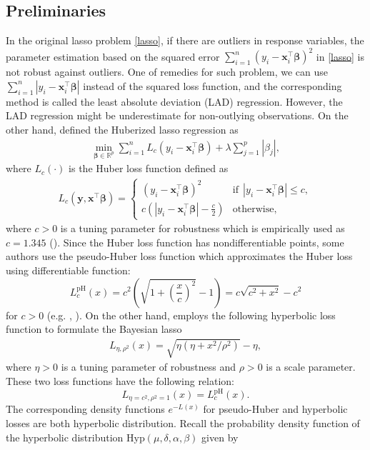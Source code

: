 \documentclass[11pt]{article}
\theoremstyle{plain}
\theoremstyle{definition}
\begin{document}
\subsection{Preliminaries} 
In the original lasso problem \eqref{lasso}, if there are outliers in response variables, the parameter estimation based on the squared error $\sum_{i=1}^n (y_i-\bm{x}_i^{\top} \bm{\beta})^2$ in \eqref{lasso} is not robust against outliers. One of remedies for such problem, we can use $\sum_{i=1}^n |y_i-\bm{x}_i^{\top} \bm{\beta}|$ instead of the squared loss function, and the corresponding method is called the least absolute deviation (LAD) regression. However, the LAD regression might be underestimate for non-outlying observations. On the other hand, \cite{RZ04} defined the Huberized lasso regression as
\begin{align*}
\min_{\bm{\beta} \in \mathbb{R}^p} \sum_{i=1}^n L_{c}(y_i-\bm{x}_i^{\top} \bm{\beta})+\lambda \sum_{j=1}^p |\beta_j|,
\end{align*}
where $L_c(\cdot)$ is the Huber loss function defined as 
\begin{align*}
L_c(\bm{y},\bm{x}^{\top} \bm\beta)=
\begin{cases}
(y_i-\bm{x}_i^{\top} \bm{\beta})^{2}   &  \mathrm{if} \ \ |y_i-\bm{x}_i^{\top} \bm{\beta}|\leq c,\\
c\left(|y_i-\bm{x}_i^{\top} \bm{\beta}|-\frac{c}{2}\right)  & \mathrm{otherwise},
\end{cases}
\end{align*}
where $c>0$ is a tuning parameter for robustness which is empirically used as $c=1.345$ (\cite{H64}). 
Since the Huber loss function has nondifferentiable points, some authors use the pseudo-Huber loss function which approximates the Huber loss using differentiable function:
\[L_c^{\mathrm{pH}}(x)=c^2\left( \sqrt{1+\left(\frac{x}{c}\right)^2}-1 \right)=c\sqrt{c^2+x^2}-c^2\]
for $c>0$ (e.g. \cite{HZ03}, \cite{S21}). On the other hand, \cite{PC08} employs  the following hyperbolic loss function to formulate the Bayesian lasso 
\begin{align*}\label{hyperb}
L_{\eta,\rho^2}(x)=\sqrt{\eta (\eta +x^2/\rho^2)}-\eta, 
\end{align*}
where $\eta>0$ is a tuning parameter of robustness and $\rho>0$ is a scale parameter. These two loss functions have the following relation:
\[L_{\eta=c^2,\rho^2=1}(x)=L_c^{\mathrm{pH}}(x).\]
The corresponding density functions $e^{-L(x)}$ for pseudo-Huber and hyperbolic losses are both hyperbolic distribution. Recall the probability density function of the hyperbolic distribution $\mathrm{Hyp}(\mu , \delta , \alpha , \beta)$ given by
\end{document}
